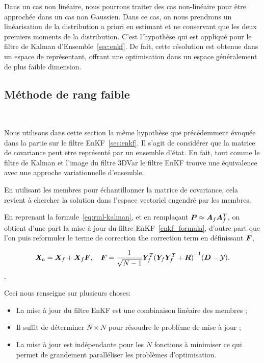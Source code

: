 Dans un cas non linéaire, nous pourrons traiter des cas non-linéaire pour être approchée dans un cas non Gaussien. Dans ce cas, on nous prendrons un linéarisation de la distribution a priori en estimant et ne conservant que les deux premiers moments de la distribution. C'est l'hypothèse qui est appliqué pour le filtre de Kalman d'Ensemble~\ref{sec:enkf}. De fait, cette résolution est obtenue dans un espace de représentant, offrant une optimisation dans un espace généralement de plus faible dimension.

\subsection{Méthode de rang faible}~\label{sec:faible_rang}

Nous utilisons dans cette section la même hypothèse que précédemment évoquée dans la partie sur le filtre EnKF~\ref{sec:enkf}. Il s'agit de considérer que la matrice de covariance peut etre représenté par un ensemble d'état. En fait, tout comme le filtre de Kalman et l'image du filtre 3DVar le filtre EnKF trouve une équivalence avec une approche variationnelle d'ensemble.

En utilisant les membres pour échantillonner la matrice de covariance, cela revient à chercher la solution dans l'espace vectoriel engendré par les membres.

En reprenant la formule~\ref{eq:rml-kalman}, et en remplaçant $\bm P \approx \bm A_f \bm A_f^T$, on obtient d'une part la mise à jour du filtre EnKF~\ref{enkf_formula}, d'autre part que l'on puis reformuler le terme de correction the correction term en définissant $\bm{F}$,

\begin{equation}
    \bm{X}_a = \bm{X}_f + \bm{X}_f \bm{F}, \quad \bm{F} = \frac{1}{\sqrt{N-1}} \bm Y_f^T {(\bm Y_f \bm Y_f^T + \bm R)}^{-1}(\bm{D} - \mathcal{Y}).
\end{equation}.

Ceci nous renseigne sur plusieurs choses:
\begin{itemize}
    \item La mise à jour du filtre EnKF est une combinaison linéaire des membres ;
    \item Il suffit de déterminer $N \times N$ pour résoudre le problème de mise à jour ;
    \item La mise à jour est indépendante pour les $N$ fonctions à minimiser ce qui permet de grandement paralléliser les problèmes d'optimisation.
\end{itemize}


